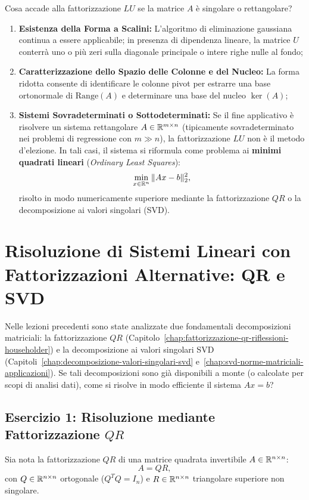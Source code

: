 Cosa accade alla fattorizzazione $LU$ se la matrice $A$ \`e singolare o rettangolare?
\begin{enumerate}
    \item \textbf{Esistenza della Forma a Scalini:} L'algoritmo di eliminazione gaussiana continua a essere applicabile; in presenza di dipendenza lineare, la matrice $U$ conterr\`a uno o pi\`u zeri sulla diagonale principale o intere righe nulle al fondo;
    \item \textbf{Caratterizzazione dello Spazio delle Colonne e del Nucleo:} La forma ridotta consente di identificare le colonne pivot per estrarre una base ortonormale di $\mathrm{Range}(A)$ e determinare una base del nucleo $\ker(A)$;
    \item \textbf{Sistemi Sovradeterminati o Sottodeterminati:} Se il fine applicativo \`e risolvere un sistema rettangolare $A \in \mathbb{R}^{m \times n}$ (tipicamente sovradeterminato nei problemi di regressione con $m \gg n$), la fattorizzazione $LU$ non \`e il metodo d'elezione. In tali casi, il sistema si riformula come problema ai \textbf{minimi quadrati lineari} (\textit{Ordinary Least Squares}):
    \begin{equation}
        \min_{x \in \mathbb{R}^n} \|Ax - b\|_2^2,
    \end{equation}
    risolto in modo numericamente superiore mediante la fattorizzazione $QR$ o la decomposizione ai valori singolari (SVD).
\end{enumerate}

\FloatBarrier
\section{Risoluzione di Sistemi Lineari con Fattorizzazioni Alternative: QR e SVD}
\label{sec:risoluzione-qr-svd}

Nelle lezioni precedenti sono state analizzate due fondamentali decomposizioni matriciali: la fattorizzazione $QR$ (Capitolo~\ref{chap:fattorizzazione-qr-riflessioni-householder}) e la decomposizione ai valori singolari SVD (Capitoli~\ref{chap:decomposizione-valori-singolari-svd} e~\ref{chap:svd-norme-matriciali-applicazioni}).
Se tali decomposizioni sono gi\`a disponibili a monte (o calcolate per scopi di analisi dati), come si risolve in modo efficiente il sistema $Ax = b$?

\subsection{Esercizio 1: Risoluzione mediante Fattorizzazione $QR$}
Sia nota la fattorizzazione $QR$ di una matrice quadrata invertibile $A \in \mathbb{R}^{n \times n}$:
\begin{equation}
    A = Q R,
\end{equation}
con $Q \in \mathbb{R}^{n \times n}$ ortogonale ($Q^T Q = I_n$) e $R \in \mathbb{R}^{n \times n}$ triangolare superiore non singolare.

